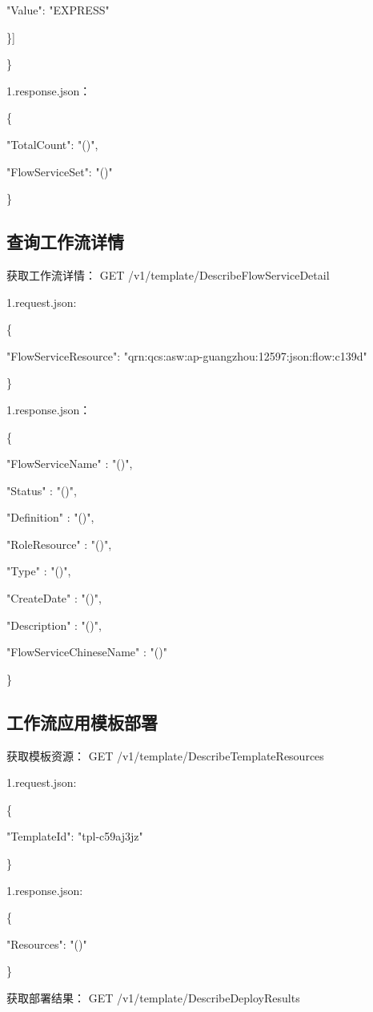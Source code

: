 "Value": "EXPRESS"

\}]

\}

1.response.json：

\{

"TotalCount": "\@exists()",

"FlowServiceSet": "\@exists()"

\}

\subsection{查询工作流详情}
获取工作流详情：
GET /v1/template/DescribeFlowServiceDetail


1.request.json:

\{

"FlowServiceResource": "qrn:qcs:asw:ap-guangzhou:12597:json:flow:c139d"

\}

1.response.json：

\{

"FlowServiceName"        :  "\@notEmpty()",

"Status"                 :  "\@notEmpty()",

"Definition"             :  "\@notEmpty()",

"RoleResource"           :  "\@notEmpty()",

"Type"                   :  "\@notEmpty()",

"CreateDate"             :  "\@notEmpty()",

"Description"            :  "\@notEmpty()",

"FlowServiceChineseName" :  "\@exists()"

\}

\subsection{工作流应用模板部署}

获取模板资源：
GET /v1/template/DescribeTemplateResources

1.request.json:

\{

"TemplateId": "tpl-c59aj3jz"

\}

1.response.json:

\{

"Resources": "\@exists()"

\}

获取部署结果：
GET /v1/template/DescribeDeployResults

